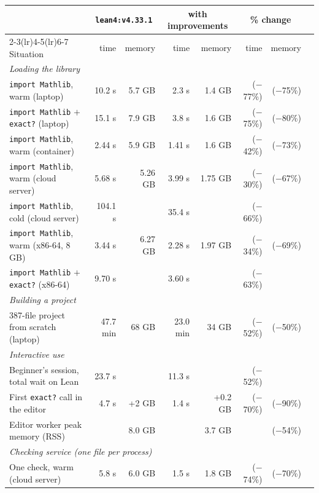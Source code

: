 \documentclass{article}
\newcommand{\Lean}{Lean\xspace}      %
\newcommand{\currentlean}{\texttt{lean4:v4.33.1}\xspace}
\newcommand{\imp}[1]{{\color{impcolor}\textrm{(#1)}}}
\begin{document}
\begin{table}[htbp]
\centering
\footnotesize
\setlength{\tabcolsep}{3pt}
\begin{tabular}{lrrrrrrl}
\toprule
 & \multicolumn{2}{c}{\currentlean} & \multicolumn{2}{c}{with improvements} & \multicolumn{2}{c}{\% change} & \\
\cmidrule(lr){2-3}\cmidrule(lr){4-5}\cmidrule(lr){6-7}
Situation & time & memory & time & memory & time & memory \\
\midrule
\multicolumn{8}{l}{\textit{Loading the library}} \\
\quad \texttt{import Mathlib}, warm (laptop) & 10.2 s & 5.7 GB & 2.3 s & 1.4 GB & \imp{$-$77\%} & \imp{$-$75\%} \\
\quad \texttt{import Mathlib} $+$ \texttt{exact?} (laptop) & 15.1 s & 7.9 GB & 3.8 s & 1.6 GB & \imp{$-$75\%} & \imp{$-$80\%} \\
\quad \texttt{import Mathlib}, warm (container) & 2.44 s & 5.9 GB & 1.41 s & 1.6 GB & \imp{$-$42\%} & \imp{$-$73\%} \\
\quad \texttt{import Mathlib}, warm (cloud server) & 5.68 s & 5.26 GB & 3.99 s & 1.75 GB & \imp{$-$30\%} & \imp{$-$67\%} \\
\quad \texttt{import Mathlib}, cold (cloud server) & 104.1 s & & 35.4 s & & \imp{$-$66\%} &  \\
\quad \texttt{import Mathlib}, warm (x86-64, 8\,GB) & 3.44 s & 6.27 GB & 2.28 s & 1.97 GB & \imp{$-$34\%} & \imp{$-$69\%} & \\
\quad \texttt{import Mathlib} $+$ \texttt{exact?} (x86-64) & 9.70 s & & 3.60 s & & \imp{$-$63\%} &  \\
\midrule
\multicolumn{8}{l}{\textit{Building a project}} \\
\quad 1{,}387-file project from scratch (laptop) & 47.7 min & 68 GB & 23.0 min & 34 GB & \imp{$-$52\%} & \imp{$-$50\%}  \\
\midrule
\multicolumn{8}{l}{\textit{Interactive use}} \\
\quad Beginner's session, total wait on \Lean & 23.7 s & & 11.3 s & & \imp{$-$52\%} &\\
\quad First \texttt{exact?} call in the editor & 4.7 s & +2 GB & 1.4 s & +0.2 GB & \imp{$-$70\%} & \imp{$-$90\%} \\
\quad Editor worker peak memory (RSS) & & 8.0 GB & & 3.7 GB & & \imp{$-$54\%} \\
\midrule
\multicolumn{8}{l}{\textit{Checking service (one file per process)}} \\
\quad One check, warm (cloud server) & 5.8 s & 6.0 GB & 1.5 s & 1.8 GB & \imp{$-$74\%} & \imp{$-$70\%} 

\end{tabular}
\end{table}
\end{document}
